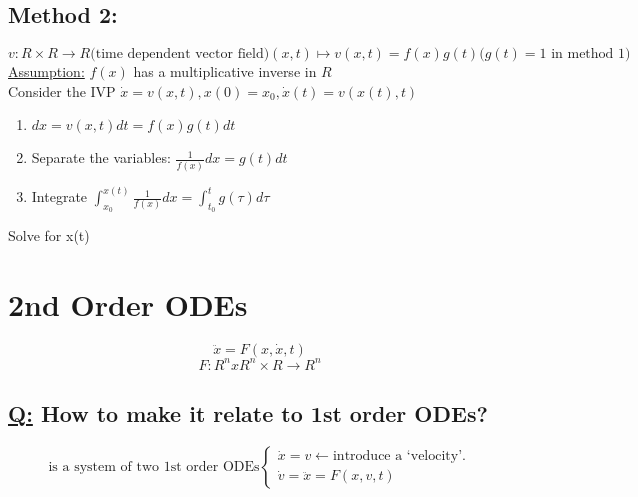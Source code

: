 \documentclass[a4paper, 12pt]{article}
\begin{document}
\subsection{Method 2:} 
$$v: R \times R \rightarrow R \text{(time dependent vector field)}  (x,t) \mapsto v(x,t) = f(x)g(t) \text{($g(t) = 1$ in method 1)}$$
\underline{Assumption:} $f(x)$ has a multiplicative inverse in $R$\\
Consider the IVP $\dot{x} = v(x,t), x(0) = x_0, \dot{x}(t) = v(x(t),t)$
\begin{enumerate}
\item $dx = v(x,t)dt = f(x)g(t)dt$
\item Separate the variables: $\frac{1}{f(x)} dx = g(t) dt$
\item Integrate $\int_{x_0}^{x(t)} \frac{1}{f(x)} dx = \int_{t_0}^{t} g(\tau) d \tau$\\
\end{enumerate} 
Solve for x(t)

\section{2nd Order ODEs}
$$\ddot{x} = F(x,\dot{x},t)$$
$$F: R^n x R^n \times R \rightarrow R^n$$
\subsection{\underline{Q:} How to make it relate to 1st order ODEs?}
\begin{equation*}
\text{is a system of two 1st order ODEs}
\begin{cases}
\dot{x} = v \leftarrow \text{introduce a `velocity'.}\\
\dot{v} = \ddot{x} = F(x,v,t)
\end{cases}
\end{equation*}
\end{document}

